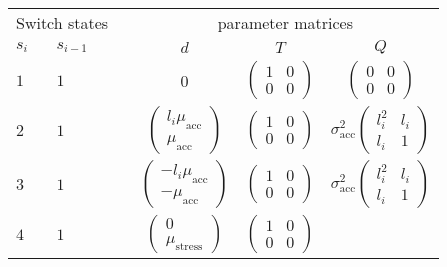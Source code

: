 \documentclass[12pt]{article}
\begin{document}
\begin{table}
\centering
\begin{tabular}[h!]{@{}llcccc@{}}
\toprule
  \multicolumn{2}{c}{Switch states} &\phantom{a}& \multicolumn{3}{c}{parameter
                                      matrices}\\
  \cmidrule{1-2} \cmidrule{4-6}
  $s_i$ & $s_{i-1}$ && $d$ & $T$ & $Q$ \\
  \midrule
  $1$ &  $1$ && 0 & $\begin{pmatrix}1&0\\0&0\end{pmatrix}$ 
                 & $\begin{pmatrix}0&0\\0&0\end{pmatrix}$\\
  $2$ & $1$ && $\begin{pmatrix} l_i\mu_{\textrm{acc}}\\ \mu_{\textrm{acc}}\end{pmatrix}$ 
                                    & $\begin{pmatrix} 1 & 0 \\ 0 &
                                      0 \end{pmatrix}$ 
        & $\sigma_{\textrm{acc}}^2\begin{pmatrix} l_i^2 & l_i\\ l_i & 1 \end{pmatrix}$\\
  $3$ & $1$ && $\begin{pmatrix} -l_i\mu_{\textrm{acc}}\\ -\mu_{\textrm{acc}}\end{pmatrix}$ 
                                    & $\begin{pmatrix} 1 & 0 \\ 0 &
                                      0 \end{pmatrix}$ 
        & $\sigma_{\textrm{acc}}^2\begin{pmatrix} l_i^2 & l_i\\ l_i & 1 \end{pmatrix}$\\
  $4$ & $1$ && $\begin{pmatrix}0\\\mu_{\textrm{stress}}\end{pmatrix}$ 
                                     & $\begin{pmatrix}1&0\\0&0\end{pmatrix}$

\end{tabular}
\end{table}
\end{document}
